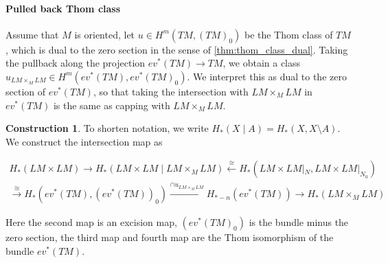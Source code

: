 \documentclass{scrartcl}
\theoremstyle{plain}
\theoremstyle{definition}
\newtheorem{construction}[theorem]{Construction}
\newcommand{\iso}{\cong}
\let\xto\xrightarrow
\let\xfrom\xleftarrow
\begin{document}
\paragraph{Pulled back Thom class}

Assume that $M$ is oriented, let $u\in H^m(TM, (TM)_0)$ be the Thom class of $TM$, which is dual to the zero section in the sense of \ref{thm:thom_class_dual}. Taking the pullback along the projection $ev^*(TM)\to TM$, we obtain a class $u_{LM\times_M LM} \in H^m(ev^*(TM), ev^*(TM)_0)$. We interpret this as dual to the zero section of $ev^*(TM)$, so that taking the intersection with $LM\times_M LM$ in $ev^*(TM)$ is the same as capping with $LM\times_M LM$.




\begin{construction}
To shorten notation, we write $H_*(X \mid A) = H_*(X, X\setminus A)$. We construct the intersection map as 

\begin{align*}
    H_*(LM\times LM) \to H_*(LM\times LM \mid LM\times_M LM) \xfrom{\iso} H_*(LM\times LM |_N, LM\times LM|_{N_0}) \\ \xto{\iso} H_*(ev^*(TM), (ev^*(TM))_0) \xto{\cap u_{LM\times_M LM}} H_{*-n}(ev^*(TM)) \to H_*(LM\times_M LM)
\end{align*}

Here the second map is an excision map, $(ev^*(TM)_0)$ is the bundle minus the zero section, the third map and fourth map are the Thom isomorphism of the bundle $ev^*(TM)$.

\end{construction}
\end{document}
